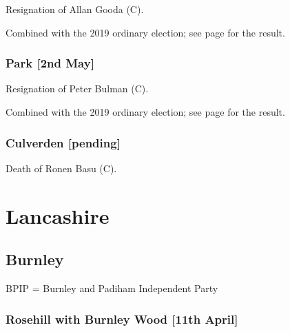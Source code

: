 \documentclass[a4paper,openany]{book}
\begin{document}
\begin{resultsiii}

Resignation of Allan Gooda (C).

Combined with the 2019 ordinary election; see page \pageref{TunbridgeWellsPaddockWoodEast} for the result.

\subsubsection*{Park \hspace*{\fill}\nolinebreak[1]%
	\enspace\hspace*{\fill}
	[2nd May]}


Resignation of Peter Bulman (C).

Combined with the 2019 ordinary election; see page \pageref{TunbridgeWellsPark} for the result.

\subsubsection*{Culverden \hspace*{\fill}\nolinebreak[1]%
	\enspace\hspace*{\fill}
	[pending]}


Death of Ronen Basu (C).

\section{Lancashire}

\subsection*{Burnley}

BPIP = Burnley and Padiham Independent Party

\subsubsection*{Rosehill with Burnley Wood \hspace*{\fill}\nolinebreak[1]%
	\enspace\hspace*{\fill}
	[11th April]}



\end{resultsiii}
\end{document}
